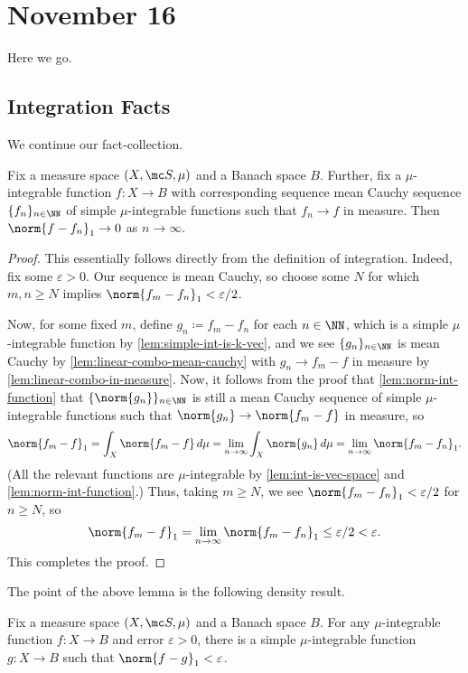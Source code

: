 \documentclass[../notes.tex]{subfiles}
\begin{document}
\section{November 16}

Here we go.

\subsection{Integration Facts}
We continue our fact-collection.
\begin{lemma} \label{lem:almost-simple-int-are-dense}
	Fix a measure space $(X,\mc S,\mu)$ and a Banach space $B$. Further, fix a $\mu$-integrable function $f\colon X\to B$ with corresponding sequence mean Cauchy sequence $\{f_n\}_{n\in\NN}$ of simple $\mu$-integrable functions such that $f_n\to f$ in measure. Then $\norm{f-f_n}_1\to0$ as $n\to\infty$.
\end{lemma}
\begin{proof}
	This essentially follows directly from the definition of integration. Indeed, fix some $\varepsilon>0$. Our sequence is mean Cauchy, so choose some $N$ for which $m,n\ge N$ implies $\norm{f_m-f_n}_1<\varepsilon/2$.
	
	Now, for some fixed $m$, define $g_n\coloneqq f_m-f_n$ for each $n\in\NN$, which is a simple $\mu$-integrable function by \autoref{lem:simple-int-is-k-vec}, and we see $\{g_n\}_{n\in\NN}$ is mean Cauchy by \autoref{lem:linear-combo-mean-cauchy} with $g_n\to f_m-f$ in measure by \autoref{lem:linear-combo-in-measure}. Now, it follows from the proof that \autoref{lem:norm-int-function} that $\{\norm{g_n}\}_{n\in\NN}$ is still a mean Cauchy sequence of simple $\mu$-integrable functions such that $\norm{g_n}\to\norm{f_m-f}$ in measure, so
	\[\norm{f_m-f}_1=\int_X\norm{f_m-f}\,d\mu=\lim_{n\to\infty}\int_X\norm{g_n}\,d\mu=\lim_{n\to\infty}\norm{f_m-f_n}_1.\]
	(All the relevant functions are $\mu$-integrable by \autoref{lem:int-is-vec-space} and \autoref{lem:norm-int-function}.) Thus, taking $m\ge N$, we see $\norm{f_m-f_n}_1<\varepsilon/2$ for $n\ge N$, so
	\[\norm{f_m-f}_1=\lim_{n\to\infty}\norm{f_m-f_n}_1\le\varepsilon/2<\varepsilon.\]
	This completes the proof.
\end{proof}
The point of the above lemma is the following density result.
\begin{corollary} \label{cor:simple-int-are-dense}
	Fix a measure space $(X,\mc S,\mu)$ and a Banach space $B$. For any $\mu$-integrable function $f\colon X\to B$ and error $\varepsilon>0$, there is a simple $\mu$-integrable function $g\colon X\to B$ such that $\norm{f-g}_1<\varepsilon$.
\end{corollary}
\end{document}
